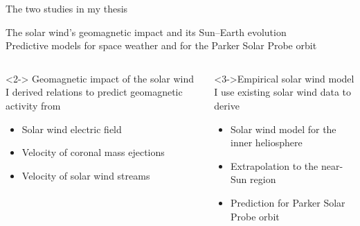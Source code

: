 {
}

\begin{frame}[plain,c]{The two studies in my thesis}{}
	\begin{block}{}
		\color{blue} \centering \Large The solar wind's geomagnetic impact and its Sun–Earth evolution\\
		\large Predictive models for space weather and for the Parker Solar Probe orbit
	\end{block}
	
	\begin{columns}[t]
		
		\begin{block}<2->{\color<4->{gray} Geomagnetic impact of the solar wind} 
			I derived relations to predict geomagnetic activity from
			\begin{itemize} 
				\item[\textcolor<4->{gray}{\textbullet}] Solar wind electric field
				\item[\textcolor<4->{gray}{\textbullet}] Velocity of coronal mass ejections
				\item[\textcolor<4->{gray}{\textbullet}] Velocity of solar wind streams
			\end{itemize}
		\end{block}
		
		
		\begin{block}<3->{Empirical solar wind model}
			I use existing solar wind data to derive
			\begin{itemize}
				\item Solar wind model for the inner heliosphere
				\item Extrapolation to the near-Sun region
				\item Prediction for Parker Solar Probe orbit
			\end{itemize}
		\end{block}
	
	\end{columns}
\end{frame}

